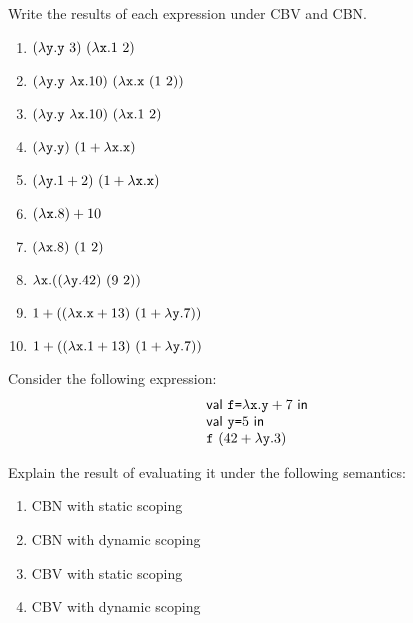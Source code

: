 \begin{exercise}

Write the results of each expression under CBV and CBN.

\begin{enumerate}
  \item $(\lambda\texttt{y}.\texttt{y}\ 3)\ (\lambda\texttt{x}.1\ 2)$
  \item
    $(\lambda\texttt{y}.\texttt{y}\ \lambda\texttt{x}.10)\ (\lambda\texttt{x}.\texttt{x}\ (1\ 2))$
  \item
    $(\lambda\texttt{y}.\texttt{y}\ \lambda\texttt{x}.10)\ (\lambda\texttt{x}.1\ 2)$
  \item
    $(\lambda\texttt{y}.\texttt{y})\ (1+\lambda\texttt{x}.\texttt{x})$
  \item
    $(\lambda\texttt{y}.1+2)\ (1+\lambda\texttt{x}.\texttt{x})$
  \item $(\lambda\texttt{x}.8)+10$
  \item $(\lambda\texttt{x}.8)\ (1\ 2)$
  \item $\lambda\texttt{x}.((\lambda\texttt{y}.42)\ (9\ 2))$
  \item
    $1+((\lambda\texttt{x}.\texttt{x}+13)\ (1+\lambda\texttt{y}.7))$
  \item
    $1+((\lambda\texttt{x}.1+13)\ (1+\lambda\texttt{y}.7))$
\end{enumerate}

\end{exercise}

\begin{exercise}

Consider the following expression:
\[
\begin{array}{l}
  \textsf{val}\ \texttt{f}\texttt{=}\lambda\texttt{x}.\texttt{y}+7\ \textsf{in}\ \\
  \textsf{val}\ \texttt{y}\texttt{=}5\ \textsf{in}\ \\
  \texttt{f}\ (42+\lambda\texttt{y}.3)
 
 
\end{array}
\]

Explain the result of evaluating it under the following semantics:
\begin{enumerate}
  \item CBN with static scoping
  \item CBN with dynamic scoping
  \item CBV with static scoping
  \item CBV with dynamic scoping
\end{enumerate}

\end{exercise}

